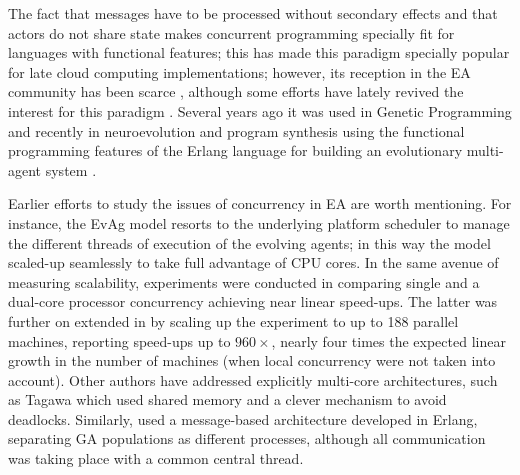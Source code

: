 \documentclass[runningheads]{llncs}\usepackage[]{graphicx}\usepackage[]{color}
\begin{document}
The fact that messages have to be processed without secondary effects
and that actors do not share state makes concurrent
programming specially fit for languages with
functional features; this has made this paradigm specially popular for
late cloud computing implementations; however, its reception 
in the EA community has been scarce \cite{Hawkins:2001:GFG:872017.872197}, 
although some efforts have lately revived
the interest for this paradigm \cite{swan2015research}.
Several years ago it was used in Genetic Programming
\cite{Briggs:2008:FGP:1375341.1375345,Huelsbergen:1996:TSE:1595536.1595579,walsh:1999:AFSFESIHLP}
and recently in neuroevolution \cite{Sher2013} and program synthesis \cite{valkov2018synthesis} 
using the functional programming features of the Erlang language
 for building an evolutionary multi-agent system \cite{barwell2017using}.

% 

Earlier efforts to study the issues of concurrency in EA are worth 
mentioning. For instance, the EvAg model \cite{evag:gpem} resorts to 
the underlying platform scheduler to manage the different threads of 
execution of the evolving agents; in this way the model scaled-up 
seamlessly to take full advantage of CPU cores. In the same avenue 
of measuring scalability,  experiments were conducted
in \cite{wcci:evoag} comparing single and a dual-core processor 
concurrency achieving near linear speed-ups. The latter
was further on extended in \cite{DBLP:conf/evoW/LaredoBMG12} by scaling
up the experiment to up to 188 parallel machines, reporting speed-ups 
up to $960\times$, nearly four times the expected linear growth 
in the number of machines (when local concurrency were not taken 
into account). Other authors have addressed explicitly multi-core 
architectures, such as Tagawa \cite{Tagawa201212} which used 
shared memory and a clever mechanism to avoid deadlocks. Similarly,
\cite{kerdprasop2012concurrent} used a message-based architecture 
developed in Erlang, separating GA populations as different
processes, although all communication was taking place with a common
central thread. 
\end{document}
